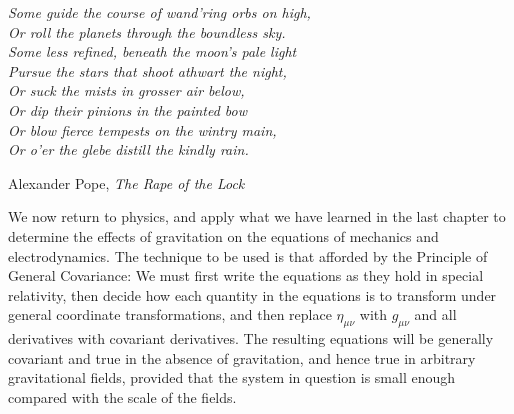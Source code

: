 
\begin{flushright}
\begin{minipage}{0.62\textwidth}
\itshape
Some guide the course of wand'ring orbs on high,\\
Or roll the planets through the boundless sky.\\
Some less refined, beneath the moon's pale light\\
Pursue the stars that shoot athwart the night,\\
Or suck the mists in grosser air below,\\
Or dip their pinions in the painted bow\\
Or blow fierce tempests on the wintry main,\\
Or o'er the glebe distill the kindly rain.

\medskip
\upshape
Alexander Pope, \textit{The Rape of the Lock}
\end{minipage}
\end{flushright}

We now return to physics, and apply what we have learned in the last chapter
to determine the effects of gravitation on the equations of mechanics and
electrodynamics. The technique to be used is that afforded by the Principle of
General Covariance: We must first write the equations as they hold in special
relativity, then decide how each quantity in the equations is to transform
under general coordinate transformations, and then replace
\(\eta_{\mu\nu}\) with \(g_{\mu\nu}\) and all derivatives with covariant
derivatives. The resulting equations will be generally covariant and true in
the absence of gravitation, and hence true in arbitrary gravitational fields,
provided that the system in question is small enough compared with the scale
of the fields.
